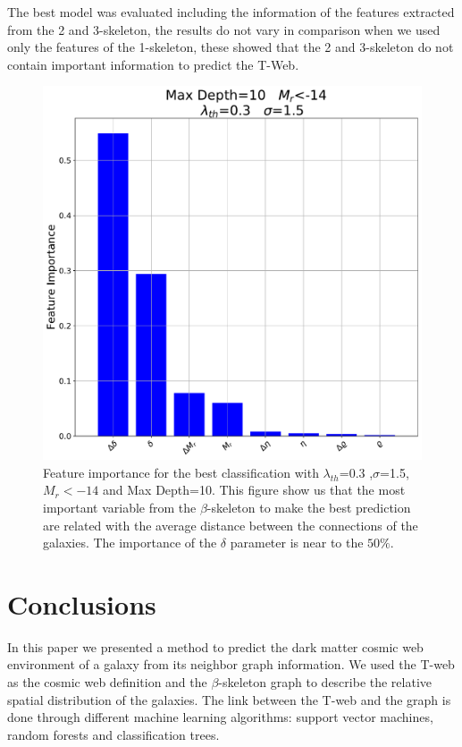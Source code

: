 \documentclass[usenatbib]{mnras}
\begin{document}
The best model was evaluated including the information of the features extracted from the 2 and 3-skeleton, the results do not vary in comparison when we used only the features of the 1-skeleton, these showed that the 2 and 3-skeleton do not contain important information to predict the T-Web.

\begin{figure}
\centering
    \includegraphics[scale=0.32]{Figs/p_FI_EnvPredTreeClass.pdf}  
    \caption{Feature importance for the best classification with $\lambda_{th}$=0.3 ,$\sigma$=1.5, $M_{r}<-14$ and Max Depth=10. This figure show us that the most important variable from the $\beta$-skeleton to make the best prediction are related with the average distance between the connections of the galaxies. The importance of the $\delta$ parameter is near to the $50\%$.}
    \label{fig:feature_importance}     
\end{figure}

\section{Conclusions}\label{sec:conclusions}

In this paper we presented a method to predict the dark matter cosmic web
environment of a galaxy from its neighbor graph information.
We used the T-web as the cosmic web definition \citep{Forero-Romero2009}
and the $\beta$-skeleton graph \citep{Fang2019} 
to describe the relative spatial distribution of the galaxies. 
The link between the T-web and the graph is done through different
machine learning algorithms: support vector machines, random forests and
classification trees.
\end{document}
